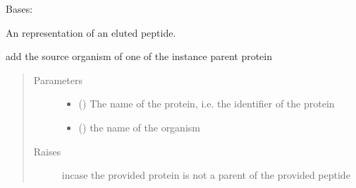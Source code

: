 \documentclass[letterpaper,10pt,english]{sphinxmanual}
\begin{document}
\begin{fulllineitems}
\label{\detokenize{IPTK.Classes:IPTK.Classes.Peptide.Peptide}}
Bases: 

An representation of an eluted peptide.

\begin{fulllineitems}
\label{\detokenize{IPTK.Classes:IPTK.Classes.Peptide.Peptide.add_org_2_parent}}
add the source organism of one of the instance parent protein
\begin{quote}\begin{description}
\item[{Parameters}] \leavevmode\begin{itemize}
\item {} 
 () \textendash{} The name of the protein, i.e. the identifier of the protein

\item {} 
 () \textendash{} the name of the organism

\end{itemize}

\item[{Raises}] \leavevmode
{} \textendash{} incase the provided protein is not a parent of the provided peptide

\end{description}\end{quote}

\end{fulllineitems}



\end{fulllineitems}
\end{document}
